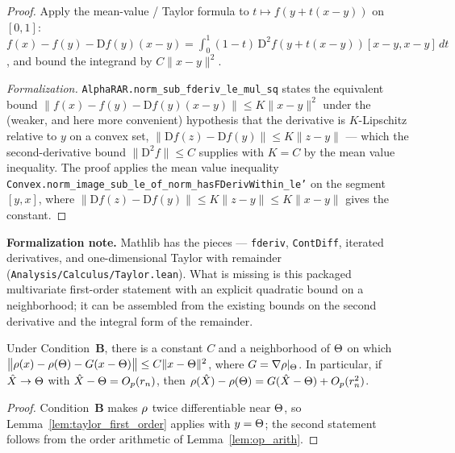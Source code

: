 \begin{proof}\leanok
Apply the mean-value / Taylor formula to $t \mapsto f(y + t(x-y))$ on $[0,1]$:
$f(x) - f(y) - \mathrm{D}f(y)(x-y)
= \int_0^1 (1-t)\, \mathrm{D}^2 f(y + t(x-y))[x-y, x-y]\, dt$, and bound the
integrand by $C\|x-y\|^2$.

\emph{Formalization.} \texttt{AlphaRAR.norm\_sub\_fderiv\_le\_mul\_sq} states the equivalent bound
$\|f(x)-f(y)-\mathrm{D}f(y)(x-y)\| \le K\|x-y\|^2$ under the (weaker, and here more convenient)
hypothesis that the derivative is $K$-Lipschitz relative to $y$ on a convex set,
$\|\mathrm{D}f(z)-\mathrm{D}f(y)\| \le K\|z-y\|$ --- which the second-derivative bound
$\|\mathrm{D}^2 f\|\le C$ supplies with $K = C$ by the mean value inequality. The proof applies the
mean value inequality \texttt{Convex.norm\_image\_sub\_le\_of\_norm\_hasFDerivWithin\_le'} on the
segment $[y,x]$, where $\|\mathrm{D}f(z)-\mathrm{D}f(y)\|\le K\|z-y\|\le K\|x-y\|$ gives the constant.
\end{proof}

\textbf{Formalization note.} Mathlib has the pieces —
\texttt{fderiv}, \texttt{ContDiff}, iterated derivatives, and one-dimensional
Taylor with remainder (\texttt{Analysis/Calculus/Taylor.lean}). What is missing
is this packaged multivariate first-order statement with an explicit quadratic
bound on a neighborhood; it can be assembled from the existing bounds on the
second derivative and the integral form of the remainder.

\begin{corollary}\label{lem:taylor_rho}
Under Condition~\textbf{B}, there is a constant $C$ and a neighborhood of
$\Theta$ on which
$\big\|\rho(x) - \rho(\Theta) - G(x - \Theta)\big\| \le C\|x - \Theta\|^2$,
where $G = \nabla\rho|_\Theta$. In particular, if $\hat X \to \Theta$ with
$\hat X - \Theta = O_p(r_n)$, then
$\rho(\hat X) - \rho(\Theta) = G(\hat X - \Theta) + O_p(r_n^2)$.
\end{corollary}

\begin{proof}
Condition~\textbf{B} makes $\rho$ twice differentiable near $\Theta$, so
Lemma~\ref{lem:taylor_first_order} applies with $y = \Theta$; the second
statement follows from the order arithmetic of Lemma~\ref{lem:op_arith}.
\end{proof}

